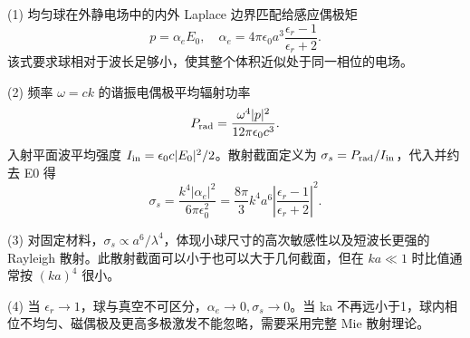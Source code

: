 (1) 均匀球在外静电场中的内外 Laplace 边界匹配给感应偶极矩
\[
p=\alpha_eE_0,\quad
\alpha_e=4\pi\epsilon_0a^3\frac{\epsilon_r-1}{\epsilon_r+2}.
\]
该式要求球相对于波长足够小，使其整个体积近似处于同一相位的电场。

(2) 频率 \(\omega=ck\) 的谐振电偶极平均辐射功率
\[
P_{\rm rad}=\frac{\omega^4|p|^2}{12\pi\epsilon_0c^3}.
\]
入射平面波平均强度 \(I_{\rm in}=\epsilon_0c|E_0|^2/2\)。散射截面定义为 \(\sigma_s=P_{\rm rad}/I_{\rm in}\)，代入并约去 E0 得
\[
\sigma_s=\frac{k^4|\alpha_e|^2}{6\pi\epsilon_0^2}
=\frac{8\pi}{3}k^4a^6
\left|\frac{\epsilon_r-1}{\epsilon_r+2}\right|^2.
\]

(3) 对固定材料，\(\sigma_s\propto a^6/\lambda^4\)，体现小球尺寸的高次敏感性以及短波长更强的 Rayleigh 散射。此散射截面可以小于也可以大于几何截面，但在 \(ka\ll 1\) 时比值通常按 \((ka)^4\) 很小。

(4) 当 \(\epsilon_r\to1\)，球与真空不可区分，\(\alpha_e\to0,\sigma_s\to0\)。当 ka 不再远小于1，球内相位不均匀、磁偶极及更高多极激发不能忽略，需要采用完整 Mie 散射理论。
